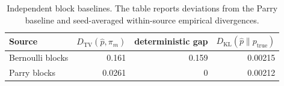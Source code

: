 \begin{table}[t]
\centering
\scriptsize
\setlength{\tabcolsep}{4pt}
\caption{Independent block baselines.  The table reports deviations from the
Parry baseline and seed-averaged within-source empirical divergences.}
\label{tab:iid_sources_fold_vs_parry_ci}
\begin{tabular}{lrrr}
\toprule
Source & $D_\mathrm{TV}(\hat p,\pi_m)$ & deterministic gap & $D_\mathrm{KL}(\hat p\|p_{\mathrm{true}})$\\
\midrule
Bernoulli blocks & 0.161 & 0.159 & 0.00215\\
Parry blocks & 0.0261 & 0 & 0.00212\\
\bottomrule
\end{tabular}
\end{table}
